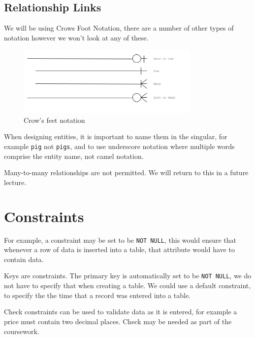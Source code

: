 \subsection*{Relationship Links}
We will be using Crows Foot Notation, there are a number of other types of notation however we won't look at any of these.
\begin{figure}[H]
    \centering
    \includegraphics[width=0.8\textwidth]{assets/relationship-links.png}
    \caption{Crow's feet notation}
\end{figure}
When designing entities, it is important to name them in the singular, for example \verb|pig| not \verb|pigs|, and to use underscore notation where multiple words comprise the entity name, not camel notation.

Many-to-many relationships are not permitted. We will return to this in a future lecture.

\section*{Constraints}

For example, a constraint may be set to be \verb|NOT NULL|, this would ensure that whenever a row of data is inserted into a table, that attribute would have to contain data.

Keys are constraints. The primary key is automatically set to be \verb|NOT NULL|, we do not have to specify that when creating a table. We could use a default constraint, to specify the the time that a record was entered into a table. 

Check constraints can be used to validate data as it is entered, for example a price must contain two decimal places. Check may be needed as part of the coursework.